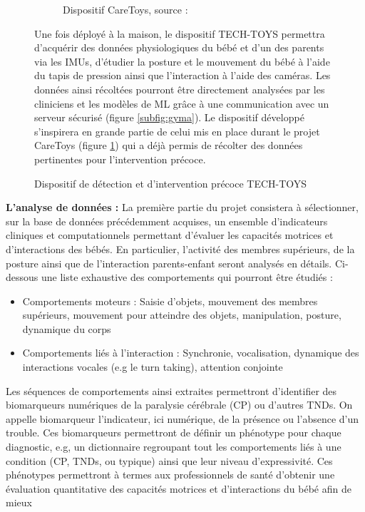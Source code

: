 \documentclass[8pt]{article}
\begin{document}
\begin{figure}[H]
\begin{subfigure}{1\textwidth}
        \caption{Dispositif CareToys, source : \cite{cecchi_caretoy_2016}}
        \label{subfig:gymb}
    \end{subfigure}
    \caption{Dispositif de détection et d’intervention précoce TECH-TOYS}
    \label{fig:gym}
    \footnotesize
    \vspace{.2cm}
    Une fois déployé à la maison, le dispositif TECH-TOYS permettra d’acquérir des données physiologiques du bébé et d’un des parents via les IMUs, d’étudier la posture et le mouvement du bébé à l’aide du tapis de pression ainsi que l’interaction
à l’aide des caméras. Les données ainsi récoltées pourront être directement analysées par les cliniciens et les modèles de ML grâce à une communication avec un serveur sécurisé (figure \ref{subfig:gyma}). Le dispositif développé s’inspirera en grande partie de celui mis en place durant le projet CareToys (figure \ref{subfig:gymb}) qui a déjà permis de récolter des données pertinentes pour l’intervention précoce.
\end{figure}
\vspace{2cm}
\textbf{L'analyse de données : } La première partie du projet consistera à sélectionner, sur la base de données précédemment acquises, un ensemble d’indicateurs cliniques et computationnels permettant d’évaluer les capacités motrices et d’interactions des bébés. En particulier, l’activité des membres supérieurs, de la posture ainsi que de l’interaction parents-enfant seront analysés en détails. Ci-dessous une liste exhaustive des comportements qui pourront être étudiés :
 \begin{itemize}
     \item Comportements moteurs : Saisie d’objets, mouvement des membres supérieurs, mouvement pour
atteindre des objets, manipulation, posture, dynamique du corps
\item Comportements liés à l’interaction : Synchronie, vocalisation, dynamique des interactions vocales
(e.g le turn taking), attention conjointe
 \end{itemize}
 Les séquences de comportements ainsi extraites permettront d’identifier des biomarqueurs numériques de
la paralysie cérébrale (CP) ou d’autres TNDs. On appelle biomarqueur l’indicateur, ici numérique, de la
présence ou l’absence d’un trouble. Ces biomarqueurs permettront de définir un phénotype pour chaque
diagnostic, e.g, un dictionnaire regroupant tout les comportements liés à une condition (CP, TNDs, ou
typique) ainsi que leur niveau d’expressivité. Ces phénotypes permettront à termes aux professionnels de
santé d’obtenir une évaluation quantitative des capacités motrices et d’interactions du bébé afin de mieux
\end{document}
